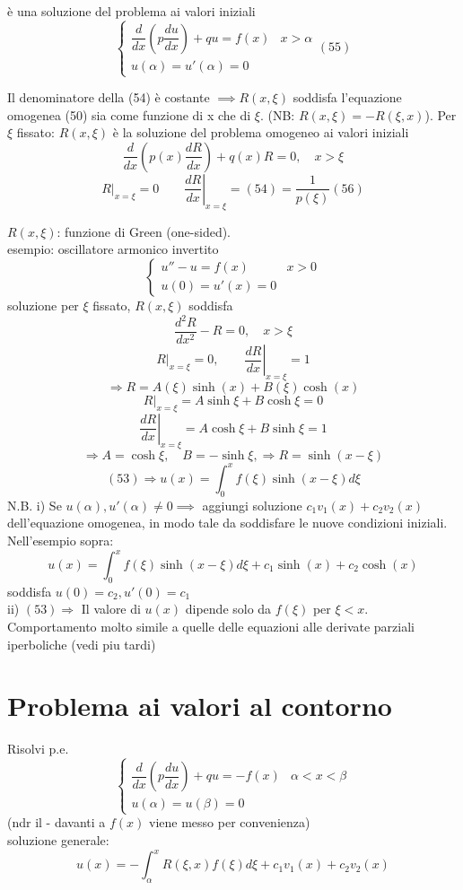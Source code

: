 \documentclass[a4paper,11pt]{report}
\begin{document}
è una soluzione del problema ai valori iniziali
\begin{equation}
\left\{\begin{matrix}
\dfrac{d}{dx}\left(p\dfrac{du}{dx}\right) + qu=f(x) & x>\alpha\\
u(\alpha)=u'(\alpha)=0 &
\end{matrix}\right. (55)
\end{equation}

Il denominatore della (54) è costante $\implies R(x,\xi)$ soddisfa l'equazione omogenea (50) sia come funzione di x che di $\xi$. (NB: $R(x,\xi)=-R(\xi,x)$). Per $\xi$ fissato: $R(x,\xi)$ è la soluzione del problema omogeneo ai valori iniziali
$$
\dfrac{d}{dx}\left(p(x)\dfrac{dR}{dx}\right) + q(x)R=0, \quad x>\xi
$$
\begin{equation}
R |_{x=\xi}=0 \qquad \left.\dfrac{dR}{dx}\right|_{x=\xi}=(54)=\dfrac{1}{p(\xi)} (56)
\end{equation}

$R(x,\xi)$: funzione di Green (one-sided).\\
esempio: oscillatore armonico invertito
$$
\left\{\begin{matrix}
u'' - u =f(x) & x>0 \\
u(0)=u'(x)=0&
\end{matrix}\right.
$$
soluzione per $\xi$ fissato, $R(x,\xi)$ soddisfa 
$$
\dfrac{d^2R}{dx^2}-R=0, \quad x>\xi
$$
$$
R|_{x=\xi}=0, \qquad \left.\dfrac{dR}{dx}\right|_{x=\xi}=1
$$
$$
\Rightarrow R= A(\xi)\sinh(x)+B(\xi)\cosh(x)
$$
$$
R|_{x=\xi}=A\sinh\xi + B \cosh \xi =0
$$
$$
\left.\dfrac{dR}{dx}\right|_{x=\xi}=A\cosh\xi + B \sinh \xi =1
$$
$$
\Rightarrow A=\cosh \xi, \quad B=-\sinh \xi, \Rightarrow R=\sinh(x-\xi)
$$
$$
(53)\Rightarrow u(x)=\int_0^x f(\xi)\sinh(x-\xi)d\xi
$$
N.B. 
i) Se $u(\alpha),u'(\alpha)\neq 0 \implies$ aggiungi soluzione $c_1v_1(x)+c_2v_2(x)$ dell'equazione omogenea, in modo tale da soddisfare le nuove condizioni iniziali. Nell'esempio sopra:
$$
u(x)=\int_0^x f(\xi)\sinh(x-\xi)d\xi + c_1\sinh(x)+ c_2\cosh(x)
$$
soddisfa $u(0)=c_2,u'(0)=c_1$\\
ii) $(53)\Rightarrow$ Il valore di $u(x)$ dipende solo da $f(\xi)$ per  $\xi<x$. Comportamento molto simile a quelle delle equazioni alle derivate parziali iperboliche (vedi piu tardi) %
\section{Problema ai valori al contorno}
Risolvi p.e.
$$\left\{\begin{matrix}
\dfrac{d}{dx}\left(p\dfrac{du}{dx}\right)+qu=-f(x) & \alpha <x<\beta\\
u(\alpha)=u(\beta)=0 &
\end{matrix}\right.
$$
(ndr il - davanti a $f(x)$ viene messo per convenienza)\\
soluzione generale:
\begin{equation}
u(x)=-\int_\alpha^x R(\xi,x)f(\xi)d\xi + c_1v_1(x)+c_2v_2(x) 
\end{equation}
\end{document}
